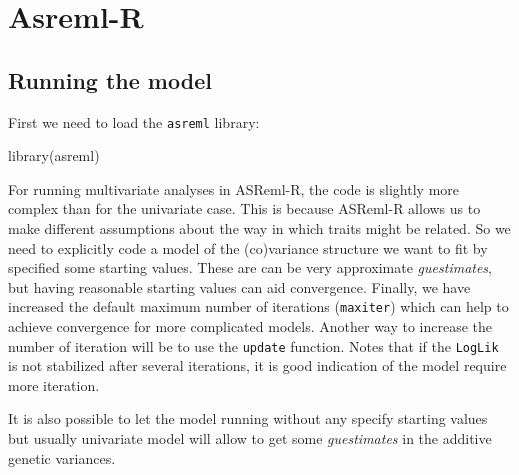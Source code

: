 \documentclass[
  12pt,
]{book}
\newenvironment{Shaded}{\begin{snugshade}}{\end{snugshade}}
\newcommand{\FunctionTok}[1]{\textcolor[rgb]{0.00,0.00,0.00}{#1}}
\newcommand{\NormalTok}[1]{#1}
\begin{document}
\hypertarget{asreml-biv}{%
\section{Asreml-R}\label{asreml-biv}}

\hypertarget{running-the-model-3}{%
\subsection{Running the model}\label{running-the-model-3}}

First we need to load the \texttt{asreml} library:

\begin{Shaded}
\begin{Highlighting}[]
\FunctionTok{library}\NormalTok{(asreml)}
\end{Highlighting}
\end{Shaded}

For running multivariate analyses in ASReml-R, the code is slightly more complex than for the univariate case. This is because ASReml-R allows us to make different assumptions about the way in which traits might be related. So we need to explicitly code a model of the (co)variance structure we want to fit by specified some starting values. These are can be very approximate \emph{guestimates}, but having reasonable starting values can aid convergence. Finally, we have increased the default maximum number of iterations (\texttt{maxiter}) which can help to achieve convergence for more complicated models. Another way to increase the number of iteration will be to use the \texttt{update} function. Notes that if the \texttt{LogLik} is not stabilized after several iterations, it is good indication of the model require more iteration.

It is also possible to let the model running without any specify starting values but usually univariate model will allow to get some \emph{guestimates} in the additive genetic variances.
\end{document}

